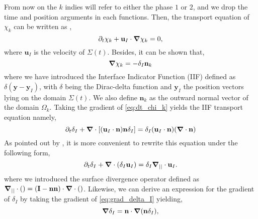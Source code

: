 From now on the $k$ indies will refer to either the phase $1$ or $2$, and we drop the time and position arguments in each functions. 
Then, the transport equation of $\chi_k$ can be written as \citep{drew1983mathematical,kataoka1986local,morel2015mathematical},
\begin{equation}
    \partial_t \chi_k
    + \textbf{u}_I \cdot \bm{\nabla} \chi_k
    = 0,
    \label{eq:dt_chi_k}
\end{equation}
where $\textbf{u}_I$ is the velocity of $\Sigma(t)$.
Besides, it can be shown \citep{tryggvason2011direct,drew1983mathematical,kataoka1986local,bothe2022sharp} that,
\begin{equation}
    \bm{\nabla} \chi_k
    = - \delta_I \textbf{n}_k
    \label{eq:grad_chi_k}
\end{equation}
where we have introduced the Interface Indicator Function (IIF) defined as $\delta(\textbf{y}-\textbf{y}_I)$, with $\delta$ being the Dirac-delta function and $\textbf{y}_I$ the position vectors lying on the domain $\Sigma(t)$.
We also define $\textbf{n}_k$ as the outward normal vector of the domain $\Omega_k$.
Taking the gradient of \ref{eq:dt_chi_k} yields the IIF transport equation namely,
\begin{equation}
    \partial_t \delta_I
    + \bm{\nabla} \cdot \left[(\textbf{u}_I\cdot\textbf{n})\textbf{n} \delta_I\right]
    = \delta_I (\textbf{u}_I\cdot\textbf{n})(\bm{\nabla} \cdot\textbf{n})
\end{equation}
As pointed out by \citet{morel2007surface}, it is more convenient to rewrite this equation under the following form,
\begin{equation}
    \partial_t \delta_I
    + \bm{\nabla} \cdot (\delta_I \textbf{u}_I)
    = \delta_I \bm{\nabla}_{||} \cdot \textbf{u}_I.
    \label{eq:dt_delta_I}
\end{equation}
where we introduced the surface divergence operator defined as $\bm{\nabla}_{||} \cdot ()= (\textbf{I}-\textbf{nn})\cdot \bm{\nabla} \cdot ()$.
Likewise, we can derive an expression for the gradient of $\delta_I$ by taking the gradient of \ref{eq:grad_delta_I} yielding,
\begin{equation}
    \bm{\nabla}\delta_I 
    = \textbf{n} \cdot \bm{\nabla} (\textbf{n} \delta_I),
    \label{eq:grad_delta_I}
\end{equation}


